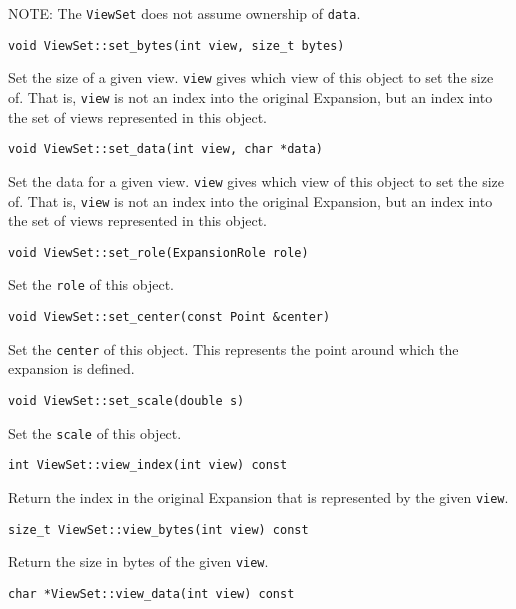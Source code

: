 NOTE: The \texttt{ViewSet} does not assume ownership of \texttt{data}.

\begin{lstlisting}
void ViewSet::set_bytes(int view, size_t bytes)
\end{lstlisting}


Set the size of a given view. \texttt{view} gives which view of this object to
set the size of. That is, \texttt{view} is not an index into the original
Expansion, but an index into the set of views represented in this object.

\begin{lstlisting}
void ViewSet::set_data(int view, char *data)
\end{lstlisting}


Set the data for a given view. \texttt{view} gives which view of this object to
set the size of. That is, \texttt{view} is not an index into the original
Expansion, but an index into the set of views represented in this object.

\begin{lstlisting}
void ViewSet::set_role(ExpansionRole role)
\end{lstlisting}


Set the \texttt{role} of this object.

\begin{lstlisting}
void ViewSet::set_center(const Point &center)
\end{lstlisting}


Set the \texttt{center} of this object. This represents the point around
which the expansion is defined.

\begin{lstlisting}
void ViewSet::set_scale(double s)
\end{lstlisting}


Set the \texttt{scale} of this object.

\begin{lstlisting}
int ViewSet::view_index(int view) const
\end{lstlisting}


Return the index in the original Expansion that is represented by the
given \texttt{view}.

\begin{lstlisting}
size_t ViewSet::view_bytes(int view) const
\end{lstlisting}


Return the size in bytes of the given \texttt{view}.

\begin{lstlisting}
char *ViewSet::view_data(int view) const
\end{lstlisting}



